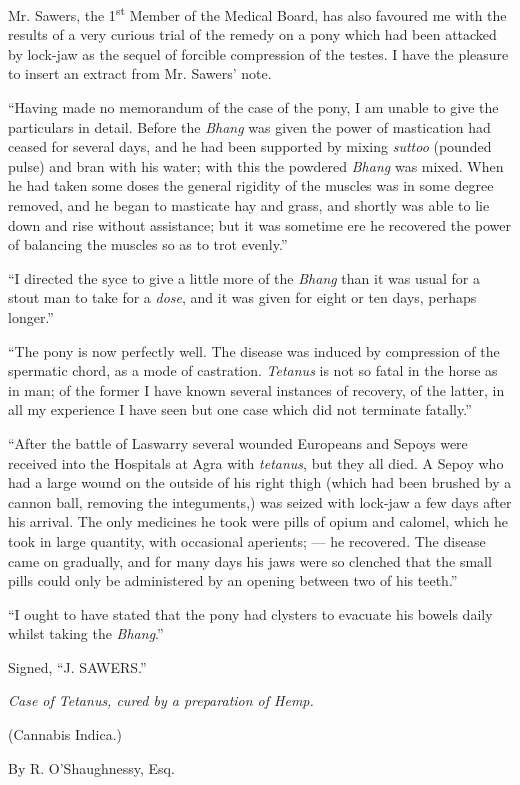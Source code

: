 \documentclass[a4paper, 11pt, oneside, polutonikogreek, english]{article}
\begin{document}
Mr. Sawers, the 1\textsuperscript{st} Member of the Medical Board, has also favoured me with the results of a very curious trial of the remedy on a pony which had been attacked by lock-jaw as the sequel of forcible compression of the testes. I have the pleasure to insert an extract from Mr. Sawers' note.

``Having made no memorandum of the case of the pony, I am unable to give the particulars in detail. Before the \emph{Bhang} was given the power of mastication had ceased for several days, and he had been supported by mixing \emph{suttoo} (pounded pulse) and bran with his water; with this the powdered \emph{Bhang} was mixed. When he had taken some doses the general rigidity of the muscles was in some degree removed, and he began to masticate hay and grass, and shortly was able to lie down and rise without assistance; but it was sometime ere he recovered the power of balancing the muscles so as to trot evenly.''

``I directed the syce to give a little more of the \emph{Bhang} than it was usual for a stout man to take for a \emph{dose}, and it was given for eight or ten days, perhaps longer.''

``The pony is now perfectly well. The disease was induced by compression of the spermatic chord, as a mode of castration. \emph{Tetanus} is not so fatal in the horse as in man; of the former I have known several instances of recovery, of the latter, in all my experience I have seen but one case which did not terminate fatally.''

``After the battle of Laswarry several wounded Europeans and Sepoys were received into the Hospitals at Agra with \emph{tetanus}, but they all died. A Sepoy who had a large wound on the outside of his right thigh (which had been brushed by a cannon ball, removing the integuments,) was seized with lock-jaw a few days after his arrival. The only medicines he took were pills of opium and calomel, which he took in large quantity, with occasional aperients; --- he recovered. The disease came on gradually, and for many days his jaws were so clenched that the small pills could only be administered by an opening between two of his teeth.''

``I ought to have stated that the pony had clysters to evacuate his bowels daily whilst taking the \emph{Bhang}.''

Signed, ``J. SAWERS.''
\begin{center}
\emph{Case of Tetanus, cured by a preparation of Hemp.}

(Cannabis Indica.)

By R. O'Shaughnessy, Esq.
\end{center}
\end{document}
